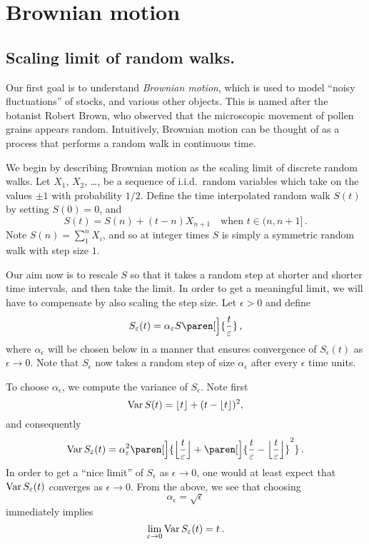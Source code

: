 
\ifstandalonechapter\setcounter{chapter}{1}\fi
\chapter{Brownian motion}
\section{Scaling limit of random walks.}
Our first goal is to understand \emph{Brownian motion}, which is used to model ``noisy fluctuations'' of stocks, and various other objects.
This is named after the botanist Robert Brown, who observed that the microscopic movement of pollen grains appears random.
Intuitively, Brownian motion can be thought of as a process that performs a random walk in continuous time.

We begin by describing Brownian motion as the scaling limit of discrete random walks.
Let $X_1$, $X_2$, \dots, be a sequence of i.i.d.\ random variables which take on the values $\pm 1$ with probability $1/2$.
Define the time interpolated random walk $S(t)$ by setting $S(0) = 0$, and
\begin{equation}\label{e:S}
  S(t) = S(n) + (t - n) X_{n+1}
  \quad\text{when } t \in (n, n+1]\,.
\end{equation}
Note $S(n) = \sum_{1}^n X_i$, and so at integer times $S$ is simply a symmetric random walk with step size $1$.

Our aim now is to rescale $S$ so that it takes a random step at shorter and shorter time intervals, and then take the limit.
In order to get a meaningful limit, we will have to compensate by also scaling the step size.
Let $\epsilon > 0$ and define
\begin{equation}\label{e:Sep}
  S_\epsilon(t) = \alpha_\epsilon S\paren[\Big]{ \frac{t}{\epsilon} }\,,
\end{equation}
where $\alpha_\epsilon$ will be chosen below in a manner that ensures convergence of $S_\epsilon(t)$ as $\epsilon \to 0$.
Note that $S_\epsilon$ now takes a random step of size $\alpha_\epsilon$ after every $\epsilon$ time units.

To choose $\alpha_\epsilon$, we compute the variance of $S_\epsilon$.
Note first
\begin{equation*}
  \operatorname{Var} S(t) = \lfloor t\rfloor + (t - \lfloor t\rfloor)^2,
\end{equation*}
and consequently
\begin{equation*}
  \var S_\epsilon(t)
    = \alpha_\epsilon^2 \paren[\Big]{
	\floor[\Big]{\frac{t}{\epsilon}}
	+ \paren[\Big]{\frac{t}{\epsilon} - \floor[\Big]{\frac{t}{\epsilon}}}^2
    }\,.
\end{equation*}
In order to get a ``nice limit'' of $S_\epsilon$ as $\epsilon \to 0$, one would at least expect that $\operatorname{Var} S_\varepsilon(t)$ converges as $\epsilon \to 0$.
From the above, we see that choosing
\begin{equation*}
  \alpha_\epsilon = \sqrt{\epsilon}
\end{equation*}
immediately implies
\begin{equation*}
  \lim_{\varepsilon \to 0} \operatorname{Var} S_\varepsilon(t) = t\,.
\end{equation*}

